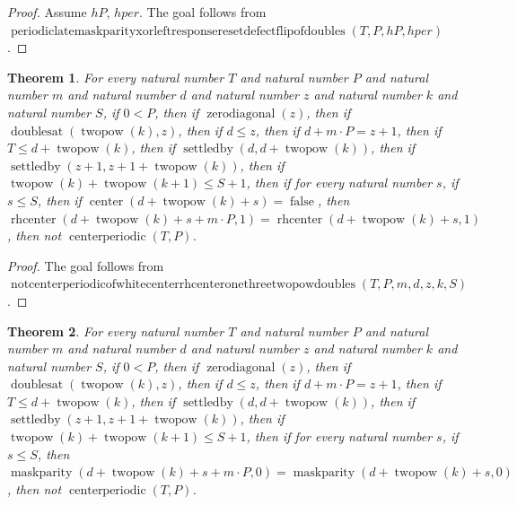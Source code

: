\documentclass[11pt]{article}
\newtheorem{theorem}{Theorem}[section]
\theoremstyle{definition}
\begin{document}
\begin{proof}
Assume \(hP\), \(hper\).
The goal follows from \(\operatorname{periodiclatemaskparityxorleftresponseresetdefectflipofdoubles}(T, P, hP, hper)\).
\end{proof}
\begin{theorem}
\label{ll:paper:not-centerperiodic-of-white-center-rhcenter-one-three-twopow-doubles}
For every natural number \(T\) and natural number \(P\) and natural number \(m\) and natural number \(d\) and natural number \(z\) and natural number \(k\) and natural number \(S\), if \(0 < P\), then if \(\operatorname{zerodiagonal}(z)\), then if \(\operatorname{doublesat}(\operatorname{twopow}(k), z)\), then if \(d \le z\), then if \(d + m \cdot P = z + 1\), then if \(T \le d + \operatorname{twopow}(k)\), then if \(\operatorname{settledby}(d, d + \operatorname{twopow}(k))\), then if \(\operatorname{settledby}(z + 1, z + 1 + \operatorname{twopow}(k))\), then if \(\operatorname{twopow}(k) + \operatorname{twopow}(k + 1) \le S + 1\), then if for every natural number \(s\), if \(s \le S\), then if \(\operatorname{center}(d + \operatorname{twopow}(k) + s) = \operatorname{false}\), then \(\operatorname{rhcenter}(d + \operatorname{twopow}(k) + s + m \cdot P, 1) = \operatorname{rhcenter}(d + \operatorname{twopow}(k) + s, 1)\), then not \(\operatorname{centerperiodic}(T, P)\).
\end{theorem}
\begin{proof}
The goal follows from \(\operatorname{notcenterperiodicofwhitecenterrhcenteronethreetwopowdoubles}(T, P, m, d, z, k, S)\).
\end{proof}
\begin{theorem}
\label{ll:paper:not-centerperiodic-of-maskparity-zero-agree-three-twopow-doubles}
For every natural number \(T\) and natural number \(P\) and natural number \(m\) and natural number \(d\) and natural number \(z\) and natural number \(k\) and natural number \(S\), if \(0 < P\), then if \(\operatorname{zerodiagonal}(z)\), then if \(\operatorname{doublesat}(\operatorname{twopow}(k), z)\), then if \(d \le z\), then if \(d + m \cdot P = z + 1\), then if \(T \le d + \operatorname{twopow}(k)\), then if \(\operatorname{settledby}(d, d + \operatorname{twopow}(k))\), then if \(\operatorname{settledby}(z + 1, z + 1 + \operatorname{twopow}(k))\), then if \(\operatorname{twopow}(k) + \operatorname{twopow}(k + 1) \le S + 1\), then if for every natural number \(s\), if \(s \le S\), then \(\operatorname{maskparity}(d + \operatorname{twopow}(k) + s + m \cdot P, 0) = \operatorname{maskparity}(d + \operatorname{twopow}(k) + s, 0)\), then not \(\operatorname{centerperiodic}(T, P)\).
\end{theorem}
\end{document}
